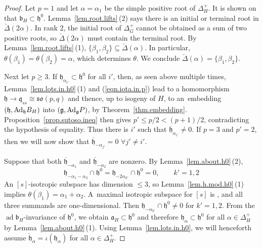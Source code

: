 \documentclass[pdftex]{sigma}
\numberwithin{equation}{section}
\theoremstyle{definition}
\newcommand{\lieh}{\mathfrak{h}}
\def\g{{\mathfrak g}}
\def\h{{\mathfrak h}}
\def\q{{\mathfrak q}}
\def\a{{\mathfrak a}}
\def\b{{\mathfrak b}}
\newcommand{\so}{\mathfrak{so}}
\newcommand{\ad}{\operatorname{ad}}
\begin{document}
\begin{proof}
Let $p=1$ and let $\alpha = \alpha_1$ be the simple positive root of $\Delta_H^+$. It is shown on \cite[p.~9]{pecastaing.rank1} that $\b_H \subset \lieh^0$.
Lemma~\ref{lem.root.lifts}\,(2) says
there is an initial or terminal root in $\check{\Delta}(2 \alpha)$. In rank 2, the initial root of $\Delta_G^+$ cannot be obtained as a sum of two positive roots, so $\check{\Delta}(2 \alpha)$ must contain the terminal root. By Lemma~\ref{lem.root.lifts}\,(1), $\{ \beta_1, \beta_2 \} \subseteq \check{\Delta}(\alpha)$. In particular, $\theta(\beta_1) = \theta(\beta_2) = \alpha$, which determines $\theta$. We conclude $\check{\Delta}(\alpha) = \{ \beta_1, \beta_2 \}$.

Next let $p \geq 3$.
If $\lieh_{\alpha_{i'}} \subset \h^0$ for all $i'$, then, as seen above multiple times, Lemma~\ref{lem.lots.in.h0}\,(1) and (\ref{eqn.iota.in.p}) lead to a homomorphism $\h \rightarrow \q_{ss} \cong \so(p,q)$ and thence, up to isogeny of $H$, to an~embedding $(\h, {\rm Ad}_\h B_H)$ into $(\g, {\rm Ad}_\g P)$, by Theorem~\ref{thm.embedding}. Proposition~\ref{prop.sutoso.ineq} then gives ${p' \leq p/2 < (p+1)/2}$, contradicting the hypothesis of equality. Thus there is $i'$ such that $\overline{\lieh}_{\alpha_{i'}} \neq 0$.
If $p=3$ and $p' = 2$, then we will now show that $\overline{\lieh}_{ - \alpha_{j'}} = 0$ $\forall j' \neq i'$.

Suppose that both $\overline{\lieh}_{- \alpha_1}$ and $\overline{\lieh}_{- \alpha_2}$ are nonzero. By Lemma~\ref{lem.about.h0}\,(2),
\[ \lieh_{- \alpha_1 - \alpha_2} \cap \lieh^0 = \lieh_{- 2 \alpha_{k'}} \cap \lieh^0 = 0 , \qquad k'=1,2\]
An $[s]$-isotropic subspace has dimension $\leq 3$, so Lemma~\ref{lem.h.mod.h0}\,(1) implies $\theta(\beta_1) = \alpha_{1} + \alpha_{2}$. A~maximal isotropic subspace for $[s]$ is \smash{$\overline{\lieh}_{- 2 \alpha_1} + \overline{\lieh}_{- \alpha_1} + \overline{\lieh}_{ - \alpha_2}$}, and all three summands are one-dimensional. Then $\lieh_{- \alpha_{k'}} \cap \lieh^0 \neq 0$ for $k'=1,2$. From the $\ad \b_H$-invariance of $\lieh^0$, we obtain $\a_H \subset \lieh^0$ and therefore $\lieh_{\alpha} \subset \lieh^0$ for all $\alpha \in \Delta_H^+$ by Lemma~\ref{lem.about.h0}\,(1). Using Lemma~\ref{lem.lots.in.h0}, we will henceforth assume $\check{\lieh}_{\alpha} = \iota(\lieh_\alpha)$ for all $\alpha \in \Delta_H^+$.


\end{proof}
\end{document}
